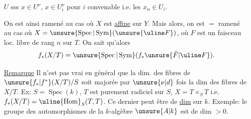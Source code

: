 $U$ sss $x\in U^\nu$,   $x\in U_i^\nu$ pour $i$ convenable i.e. les $x_\alpha\in U_i$. 

On est ainsi ramené au cas où $X$ est \uline{affine} sur $Y$. Mais alors, on est $=$ ramené au cas où $X=\unsure{\operatorname{Spec}|\operatorname{Sym}}(\unsure{\uline F})$, où $F$ est un faisceau loc. libre de rang $n$ sur $T$. On sait qu'alors
\[
f_*(X/T)=\unsure{\operatorname{Spec}|\operatorname{Sym}}(f_*\unsure{\check F|\uline F}).
\]


\uline{Remarque} Il n'est pas vrai en général que la dim. des fibres de $\unsure{f_*|f^*}(X/T)/S$ soit majorée par $\unsure{\nu|d}$ fois la dim des fibres de  $X/T$. Ex:
$S=\operatorname{Spec}(k)$, $T$ est purement radiciel sur $S$, $X=T\times_S T$ i.e. $f_*(X/T)=\uline{\operatorname{Hom}}_S(T,T)$. Ce dernier peut être de \uline{dim}   sur $k$. Exemple: le groupe des automorphismes de la $k$-algèbre $\unsure{A|k}$ est de dim $>0$.
